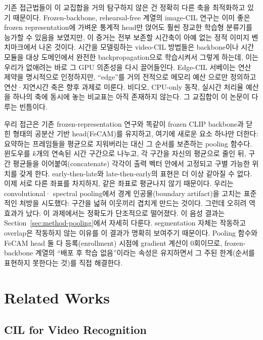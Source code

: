 \documentclass[11pt]{article}
\begin{document}
기존 접근법들이 이 교집합을 거의 탐구하지 않은 건 정확히 다른 축을
최적화하고 있기 때문이다. Frozen-backbone, rehearsal-free 계열의
image-CIL 연구는 이미 좋은 frozen representation에 가벼운 통계적 head만
얹어도 훨씬 정교한 학습형 분류기를 능가할 수 있음을 보였지만, 이 증거는
전부 보존할 시간축이 아예 없는 정적 이미지 벤치마크에서 나온 것이다.
시간을 모델링하는 video-CIL 방법들은 backbone이나 시간 모듈을 대상
도메인에서 완전한 backpropagation으로 학습시켜서 그렇게 하는데, 이는
우리가 없애려는 바로 그 GPU 의존성을 다시 끌어들인다. Edge-CIL 서베이는
연산 제약을 명시적으로 인정하지만, ``edge''를 거의 전적으로 메모리 예산
으로만 정의하고 연산·지연시간 축은 향후 과제로 미룬다. 비디오, CPU-only
동작, 실시간 처리율 예산을 하나의 축에 동시에 놓는 비교표는 아직 존재하지
않는다. 그 교집합이 이 논문이 다루는 빈틈이다.

우리 접근은 기존 frozen-representation 연구와 똑같이 frozen CLIP backbone과
닫힌 형태의 공분산 기반 head(FeCAM)를 유지하고, 여기에 새로운 요소 하나만
더한다: 요약하는 프레임들을 평균으로 지워버리는 대신 그 순서를 보존하는
pooling 함수다. 윈도우를 $k$개의 연속된 시간 구간으로 나누고, 각 구간을
자신의 평균으로 줄인 뒤, 구간 평균들을 이어붙여(concatenate) 각각이 출력
벡터 안에서 고정되고 구별 가능한 위치를 갖게 한다. early-then-late와
late-then-early의 표현은 더 이상 같아질 수 없다. 이제 서로 다른 좌표를
차지하지, 같은 좌표로 평균나지 않기 때문이다. 우리는 convolutional·
spectral pooling에서 경계 인공물(boundary artifact)을 고치는 표준적인
처방을 시도했다: 구간을 넓혀 이웃끼리 겹치게 만드는 것이다. 그런데
오히려 역효과가 났다: 이 과제에서는 정확도가 단조적으로 떨어졌다. 이
음성 결과는 Section~\ref{sec:method-pooling}에서 자세히 다룬다.
segmentation 자체는 작동하고 overlap은 작동하지 않는 이유를 이 결과가
명확히 보여주기 때문이다.
Pooling 함수와 FeCAM head 둘 다 등록(enrollment) 시점에 gradient 계산이
0회이므로, frozen-backbone 계열의 ``배포 후 학습 없음''이라는 속성은
유지하면서 그 주된 한계(순서를 표현하지 못한다는 것)를 직접 해결한다.


\section{Related Works}
\label{sec:related}

\subsection{CIL for Video Recognition}
\end{document}
